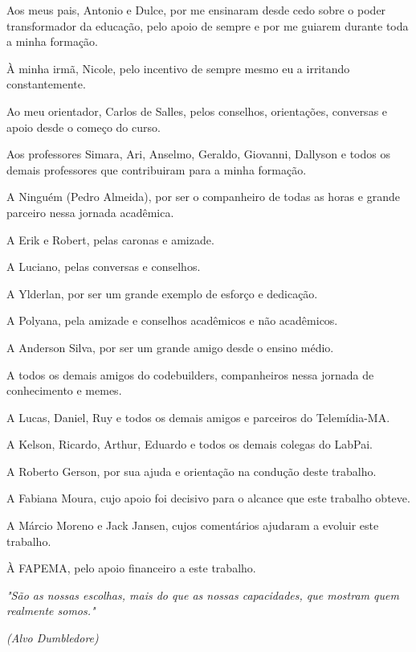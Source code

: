 \documentclass[
	12pt,				%
	openright,			%
	oneside,			%
	a4paper,			%
	ho do papel. 
	english,			%
	french,				%
	spanish,			%
	brazil,				%
	]{abntex2}
\begin{document}

\begin{agradecimentos}

Aos meus pais, Antonio e Dulce, por me ensinaram desde cedo sobre o poder transformador da educação, pelo apoio de sempre e por me guiarem durante toda a minha formação.

À minha irmã, Nicole, pelo incentivo de sempre mesmo eu a irritando constantemente.

Ao meu orientador, Carlos de Salles, pelos conselhos, orientações, conversas e apoio desde o começo do curso.

Aos professores Simara, Ari, Anselmo, Geraldo, Giovanni, Dallyson e todos os demais professores que contribuiram para a minha formação.

A Ninguém (Pedro Almeida), por ser o companheiro de todas as horas e grande parceiro nessa jornada acadêmica.

A Erik e Robert, pelas caronas e amizade.

A Luciano, pelas conversas e conselhos.

A Ylderlan, por ser um grande exemplo de esforço e dedicação.

A Polyana, pela amizade e conselhos acadêmicos e não acadêmicos.

A Anderson Silva, por ser um grande amigo desde o ensino médio.

A todos os demais amigos do codebuilders, companheiros nessa jornada de conhecimento e memes.

A Lucas, Daniel, Ruy e todos os demais amigos e parceiros do Telemídia-MA.

A Kelson, Ricardo, Arthur, Eduardo e todos os demais colegas do LabPai.

A Roberto Gerson, por sua ajuda e orientação na condução deste trabalho.

A Fabiana Moura, cujo apoio foi decisivo para o alcance que este trabalho obteve.

A Márcio Moreno e Jack Jansen, cujos comentários ajudaram a evoluir este trabalho.

À FAPEMA, pelo apoio financeiro a este trabalho.



\end{agradecimentos}

\begin{epigrafe} 
\vspace*{\fill} 
\begin{flushright} 
\textit{"São as nossas escolhas, mais do que as nossas capacidades, que mostram quem realmente somos."} 

\textit{(Alvo Dumbledore)}
\end{flushright} 


\end{epigrafe} 
\end{document}
